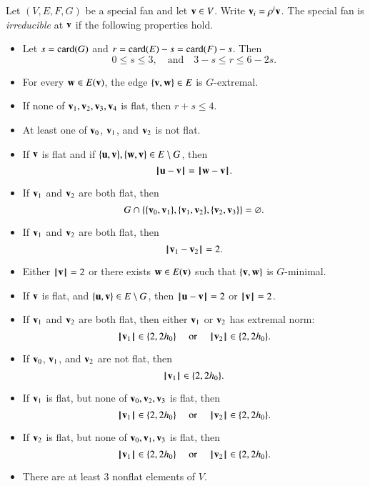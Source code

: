 \begin{definition}[irreducible]  Let $(V,E,F,G)$ be a special fan and let $\v\in V$.  
Write $\v_i  = \rho^i \v$.
The special fan is {\it irreducible} at $\v$
if the following properties hold. 
\begin{itemize}
\item {} %
 Let      $s=\card(G)$ and $r=\card(E) - s = \card(F)-s$.  Then
$$0\le s \le 3,\quad\text{and}\quad3-s \le r \le 6 - 2s.$$
\item {} For every $\w\in E(\v)$,  the edge $\{\v,\w\}\in E$ is $G$-extremal.
\item {}  If none of $\v_1,\v_2,\v_3,\v_4$ is flat, then $r+s\le 4$. 
\item {} At least one of $\v_0$, $\v_1$, and $\v_2$ is not flat.
\item {} If $\v$ is flat and if $\{\u,\v\},\{\w,\v\}\in E\setminus G$, then
$$
\norm{\u}{\v} = \norm{\w}{\v}.
$$
\item {} If $\v_1$ and $\v_2$ are both flat, then 
$$G\cap \{\{\v_0,\v_1\},\{\v_1,\v_2\},\{\v_2,\v_3\}\} = \emptyset.$$
\item {} If $\v_1$ and $\v_2$ are both flat, then
$$
\norm{\v_1}{\v_2} = 2.
$$
\item {} Either $\normo{\v}=2$ or there exists $\w\in E(\v)$ such
that $\{\v,\w\}$ is $G$-minimal.
\item {} If $\v$ is flat, and $\{\u,\v\}\in E\setminus G$, then
$\norm{\u}{\v}=2$ or $\normo{\v}=2$.
\item {} If $\v_1$ and $\v_2$ are both flat, then either $\v_1$ or $\v_2$
has extremal norm:
$$\normo{\v_1}\in \{2,2\hm\}\quad\text{ or }\quad \normo{\v_2}\in \{2,2\hm\}.$$
\item {}  If $\v_0$, $\v_1$, and $\v_2$ are not flat, then
$$
\normo{\v_1}\in \{2,2\hm\}.
$$
\item {}  If $\v_1$ is flat, but none of $\v_0,\v_2,\v_3$ is flat, then
$$
\normo{\v_1}\in \{2,2\hm\}\quad\text{ or }\quad\normo{\v_2}\in \{2,2\hm\}.
$$
\item {}  If $\v_2$ is flat, but none of $\v_0,\v_1,\v_3$ is flat, then
$$
\normo{\v_1}\in \{2,2\hm\}\quad\text{ or }\quad\normo{\v_2}\in \{2,2\hm\}.
$$
\item {} There are at least $3$ nonflat elements of $V$.
\end{itemize}
\end{definition}



